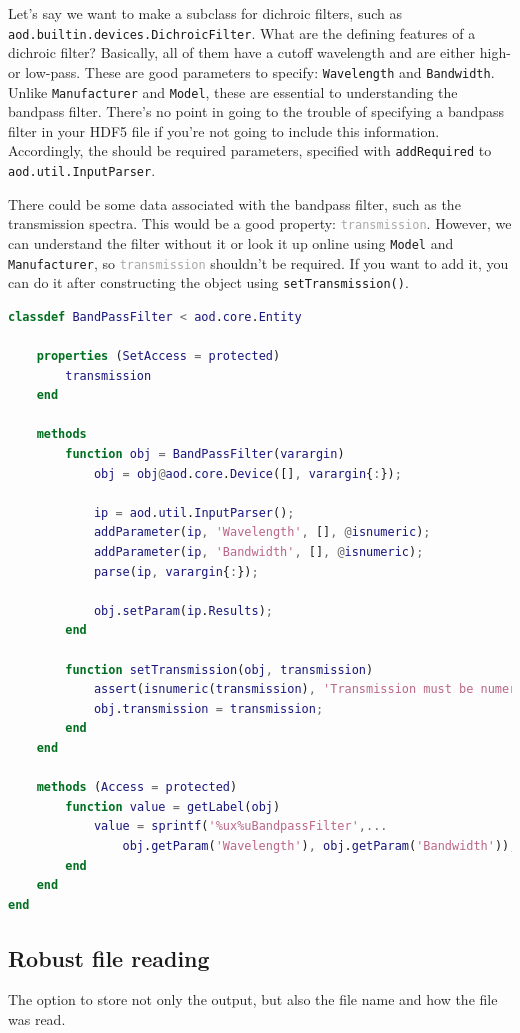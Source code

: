 \documentclass[10pt]{exam}
\newcommand\aodparam[1]{\textcolor{codepurple}{\texttt{#1}}}
\newcommand\aodclass[1]{\textcolor{codeblue}{\texttt{#1}}}
\newcommand\aodprop[1]{\textcolor{darkgray}{\texttt{#1}}}
\newcommand\aodfcn[1]{\textcolor{darkteal}{\texttt{#1}}}
\begin{document}
	Let's say we want to make a subclass for dichroic filters, such as \aodclass{aod.builtin.devices.DichroicFilter}. What are the defining features of a dichroic filter? Basically, all of them have a cutoff wavelength and are either high- or low-pass. These are good parameters to specify: \aodparam{Wavelength} and \aodparam{Bandwidth}. Unlike \aodparam{Manufacturer} and \aodparam{Model}, these are essential to understanding the bandpass filter. There's no point in going to the trouble of specifying a bandpass filter in your HDF5 file if you're not going to include this information. Accordingly, the should be required parameters, specified with \texttt{addRequired} to \aodclass{aod.util.InputParser}.
	
	There could be some data associated with the bandpass filter, such as the transmission spectra. This would be a good property: \aodprop{transmission}. However, we can understand the filter without it or look it up online using \aodparam{Model} and \aodparam{Manufacturer}, so \aodprop{transmission} shouldn't be required. If you want to add it, you can do it after constructing the object using \aodfcn{setTransmission()}.
	\begin{lstlisting}[language=matlab]
classdef BandPassFilter < aod.core.Entity

	properties (SetAccess = protected)
		transmission
	end
	
	methods
		function obj = BandPassFilter(varargin)
			obj = obj@aod.core.Device([], varargin{:});
			
			ip = aod.util.InputParser();
			addParameter(ip, 'Wavelength', [], @isnumeric);
			addParameter(ip, 'Bandwidth', [], @isnumeric);
			parse(ip, varargin{:});
			
			obj.setParam(ip.Results);
		end
		
		function setTransmission(obj, transmission)
			assert(isnumeric(transmission), 'Transmission must be numeric!');
			obj.transmission = transmission;
		end
	end
	
	methods (Access = protected)
		function value = getLabel(obj)
			value = sprintf('%ux%uBandpassFilter',...
				obj.getParam('Wavelength'), obj.getParam('Bandwidth'));
		end
	end
end
	\end{lstlisting}	
	\subsection{Robust file reading}
		\noindent The option to store not only the output, but also the file name and how the file was read.
\end{document}
